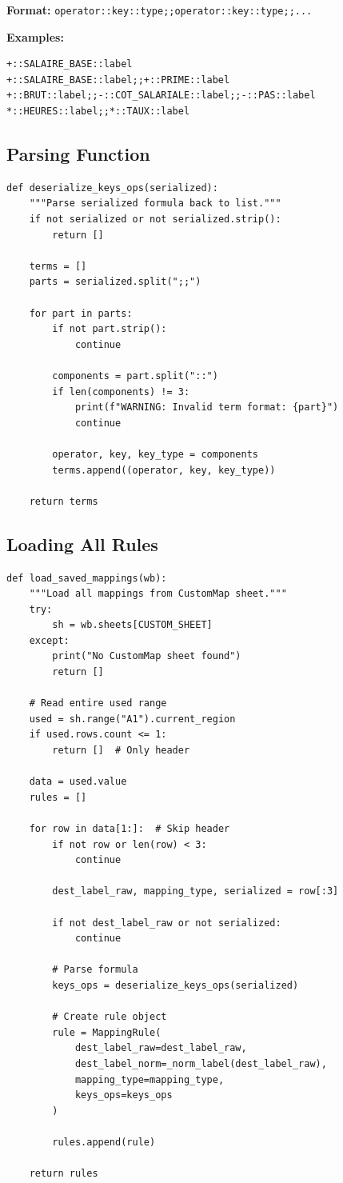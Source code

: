 \textbf{Format:} \texttt{operator::key::type;;operator::key::type;;...}

\textbf{Examples:}

\begin{lstlisting}
+::SALAIRE_BASE::label
+::SALAIRE_BASE::label;;+::PRIME::label
+::BRUT::label;;-::COT_SALARIALE::label;;-::PAS::label
*::HEURES::label;;*::TAUX::label
\end{lstlisting}

\subsection{Parsing Function}

\begin{lstlisting}[style=pythonstyle]
def deserialize_keys_ops(serialized):
    """Parse serialized formula back to list."""
    if not serialized or not serialized.strip():
        return []
    
    terms = []
    parts = serialized.split(";;")
    
    for part in parts:
        if not part.strip():
            continue
        
        components = part.split("::")
        if len(components) != 3:
            print(f"WARNING: Invalid term format: {part}")
            continue
        
        operator, key, key_type = components
        terms.append((operator, key, key_type))
    
    return terms
\end{lstlisting}

\subsection{Loading All Rules}

\begin{lstlisting}[style=pythonstyle]
def load_saved_mappings(wb):
    """Load all mappings from CustomMap sheet."""
    try:
        sh = wb.sheets[CUSTOM_SHEET]
    except:
        print("No CustomMap sheet found")
        return []
    
    # Read entire used range
    used = sh.range("A1").current_region
    if used.rows.count <= 1:
        return []  # Only header
    
    data = used.value
    rules = []
    
    for row in data[1:]:  # Skip header
        if not row or len(row) < 3:
            continue
        
        dest_label_raw, mapping_type, serialized = row[:3]
        
        if not dest_label_raw or not serialized:
            continue
        
        # Parse formula
        keys_ops = deserialize_keys_ops(serialized)
        
        # Create rule object
        rule = MappingRule(
            dest_label_raw=dest_label_raw,
            dest_label_norm=_norm_label(dest_label_raw),
            mapping_type=mapping_type,
            keys_ops=keys_ops
        )
        
        rules.append(rule)
    
    return rules
\end{lstlisting}

